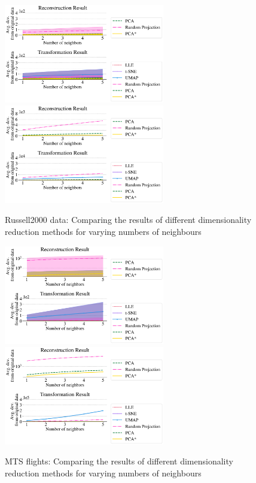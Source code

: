\documentclass[pdftex,12pt,a4paper]{report}
\begin{document}
\begin{figure} [htb!]
    \includegraphics[width=7cm]{./images/real-world/russell2000_stock/num_neigh/transformed_1lines_504points_euclidean.pdf}
    \includegraphics[width=7cm]{./images/real-world/russell2000_stock/num_neigh/transformed_1lines_504points_multiple_scalar_product.pdf}
    \caption{Russell2000 data: Comparing the results of different dimensionality reduction methods for varying numbers of neighbours} \label{fig:num_neigh-russell}
\end{figure}
\begin{figure}[htb!]
    \includegraphics[width=7cm]{./images/real-world/flights/num_neigh/transformed_10lines_4660points_euclidean.pdf}
    \includegraphics[width=7cm]{./images/real-world/flights/num_neigh/transformed_10lines_4660points_multiple_scalar_product.pdf}
    \caption{MTS flights: Comparing the results of different dimensionality reduction methods for varying numbers of neighbours}\label{fig:num_neigh-flights}
\end{figure}
\end{document}

